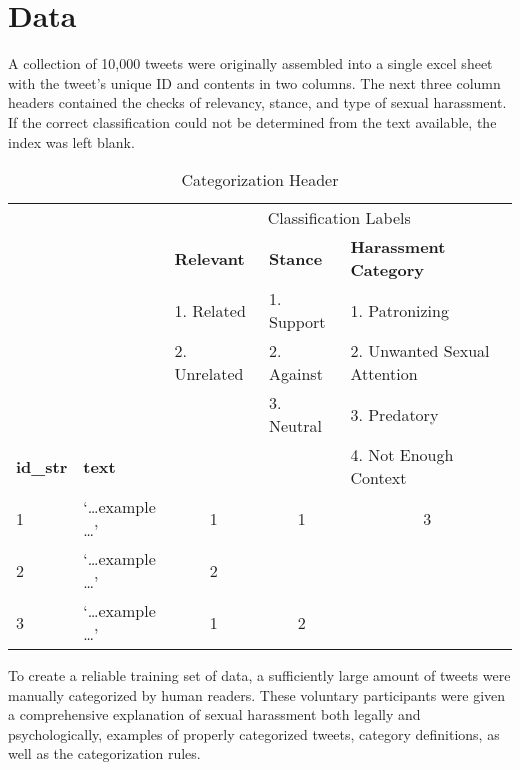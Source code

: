 \section{Data}

A collection of 10,000 tweets were originally assembled into a single excel sheet with the tweet's unique ID and contents in two columns. The next three column headers contained the checks of relevancy, stance, and type of sexual harassment. If the correct classification could not be determined from the text available, the index was left blank.

\begin{table}[H]
    \centering
    \caption{Categorization Header}
    \begin{tabular}{b{1cm} b{2.5cm} b{2cm} b{2cm} b{4.7cm}}
        \toprule
        \multicolumn{2}{c}{} &
        \multicolumn{3}{c}{Classification Labels}\\
        \cmidrule(lr){3-5}
        \rowcolor{White}& {} & {\textbf{Relevant}} & {\textbf{Stance}} & {\textbf{Harassment Category}} \\
        & {} & {1. Related} & {1. Support} & {1. Patronizing} \\
        \rowcolor{White}& {} & {2. Unrelated} & {2. Against} & {2. Unwanted Sexual Attention} \\
        & {} & {} & {3. Neutral} & {3. Predatory} \\
        \rowcolor{White}\textbf{id\_str} & {\textbf{text}} & {} & {} & {4. Not Enough Context} \\

        \midrule
        1 & `\ldots example \ldots' & \multicolumn{1}{c}{1} & \multicolumn{1}{c}{1} & \multicolumn{1}{c}{3}\\
        2 & `\ldots example \ldots' & \multicolumn{1}{c}{2} & \multicolumn{1}{c}{ } & \multicolumn{1}{c}{ }\\
        3 & `\ldots example \ldots' & \multicolumn{1}{c}{1} & \multicolumn{1}{c}{2} & \multicolumn{1}{c}{ }\\
        \bottomrule
    \end{tabular}
\end{table}


To create a reliable training set of data, a sufficiently large amount of tweets were manually categorized by human readers. These voluntary participants were given a comprehensive explanation of sexual harassment both legally and psychologically, examples of properly categorized tweets, category definitions, as well as the categorization rules.

